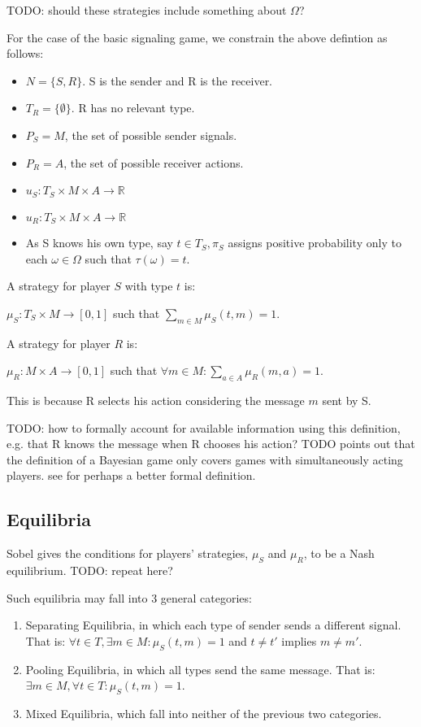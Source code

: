 \documentclass{article}
\begin{document}
TODO: should these strategies include something about $\Omega$?

\noindent For the case of the basic signaling game, we constrain the above defintion as follows:

\begin{itemize}
\item $N = \{S, R\}$. S is the sender and R is the receiver.
\item $T_{R} = \{\emptyset\}$. R has no relevant type.
\item $P_{S} = M$, the set of possible sender signals.
\item $P_{R} = A$, the set of possible receiver actions. 
\item $u_{S}: T_{S} \times M \times A \to \mathbb{R}$
\item $u_{R}: T_{S} \times M \times A \to \mathbb{R}$
\item As S knows his own type, say $t \in T_{S}, \pi_{S}$ assigns positive probability only to each $\omega \in \Omega$ such that $\tau(\omega) = t$.
\end{itemize}

\noindent A strategy for player $S$ with type $t$ is:

$\mu_S: T_S \times M \to [0,1]$ such that $\sum_{m \in M} \mu_S(t, m) = 1$.

\noindent A strategy for player $R$ is:

$\mu_R: M \times A \to [0,1]$ such that $\forall m 
\in M: \sum_{a \in A} \mu_R(m, a) = 1$.

\noindent This is because R selects his action considering the message $m$ sent by S.

TODO: how to formally account for available information using this definition, e.g. that R knows the message when R chooses his action?
TODO \cite{nurmi1} points out that the definition of a Bayesian game only covers games with simultaneously acting players. see \cite{fudenberg1} for perhaps a better formal definition.

\subsection{Equilibria}

Sobel \cite{sobel1} gives the conditions for players' strategies, $\mu_S$ and $\mu_R$, to be a Nash equilibrium. TODO: repeat here?

Such equilibria may fall into 3 general categories:
\begin{enumerate}
\item Separating Equilibria, in which each type of sender sends a different signal. That is: $\forall t \in T, \exists m \in M : \mu_S(t,m) = 1$ and $t \ne t'$ implies $m \ne m'.$
\item Pooling Equilibria, in which all types send the same message. That is: $\exists  m \in M, \forall t \in T : \mu_S(t,m) = 1$.
\item Mixed Equilibria, which fall into neither of the previous two categories.
\end{enumerate}
\end{document}
